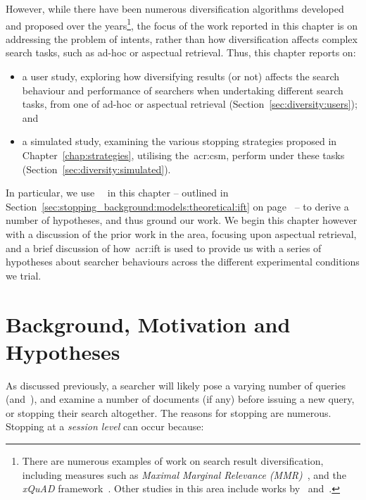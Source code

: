 However, while there have been numerous diversification algorithms developed and proposed over the years\footnote{There are numerous examples of work on search result diversification, including measures such as \emph{Maximal Marginal Relevance (MMR)}~\citep{carbonell1998mmr}, and the \emph{xQuAD} framework~\citep{santos2010query_reformulations_diversification, santos2011intent}. Other studies in this area include works by~\cite{chen2006probabilistic_models} and~\cite{zhai2015subtopics}.}, the focus of the work reported in this chapter is on addressing the problem of intents, rather than how diversification affects complex search tasks, such as ad-hoc or aspectual retrieval. Thus, this chapter reports on:

\begin{itemize}
    \item{a user study, exploring how diversifying results (or not) affects the search behaviour and performance of searchers when undertaking different search tasks, from one of ad-hoc or aspectual retrieval (Section~\ref{sec:diversity:users}); and}
    \item{a simulated study, examining the various stopping strategies proposed in Chapter~\ref{chap:strategies}, utilising the~\gls{acr:csm}, perform under these tasks (Section~\ref{sec:diversity:simulated}).}
\end{itemize}

In particular, we use~~\citep{pirolli1999ift} in this chapter -- outlined in Section~\ref{sec:stopping_background:models:theoretical:ift} on page~\pageref{sec:stopping_background:models:theoretical:ift} -- to derive a number of hypotheses, and thus ground our work. We begin this chapter however with a discussion of the prior work in the area, focusing upon aspectual retrieval, and a brief discussion of how~\gls{acr:ift} is used to provide us with a series of hypotheses about searcher behaviours across the different experimental conditions we trial.

\section{Background, Motivation and Hypotheses}\label{sec:diversity:background}
As discussed previously, a searcher will likely pose a varying number of queries (and~), and examine a number of documents (if any) before issuing a new query, or stopping their search altogether. The reasons for stopping are numerous. Stopping at a \emph{session level} can occur because:

